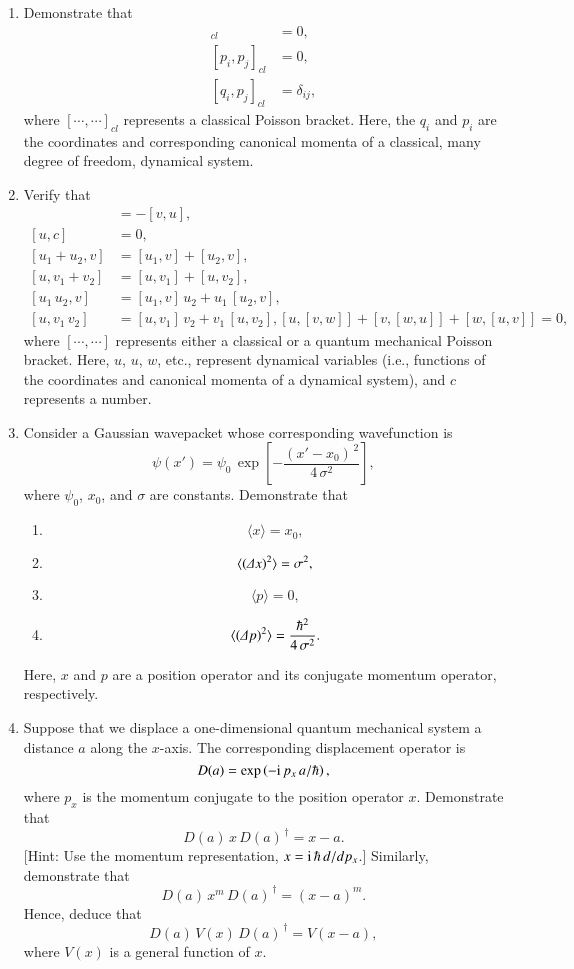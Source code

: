\begin{enumerate}[label=\thechapter.\arabic*,leftmargin=*,widest=9.20]
\item Demonstrate that
\begin{align}
[q_i, q_j]_{cl} &= 0,\nonumber\\[0.5ex]
[p_i, p_j]_{cl} &= 0,\nonumber\\[0.5ex]
[q_i, p_j]_{cl} &= \delta_{ij},\nonumber
\end{align}
where $[\cdots,\cdots]_{cl}$ represents a classical Poisson bracket. Here, the $q_i$ and $p_i$ are
the coordinates and corresponding canonical momenta of a classical, many degree of freedom, dynamical system.
\item Verify that 
\begin{align}
[u, v] &= - [v, u],\nonumber\\[0.5ex]
[u, c] &= 0,\nonumber\\[0.5ex]
[u_1+ u_2, v] &= [u_1, v] + [u_2, v],\nonumber\\[0.5ex]
[u, v_1 + v_2]&= [u, v_1] + [u, v_2],\nonumber\\[0.5ex]
[u_1\, u_2, v] &= [u_1, v] \,u_2 + u_1\, [u_2, v],\nonumber\\[0.5ex]
[u, v_1 \,v_2] &= [u, v_1] \,v_2 + v_1 \,[u, v_2],\nonumber
[u, [v, w] ]+ [v, [w, u] ] + [w, [u, v]] = 0,\nonumber
\end{align}
where $[\cdots,\cdots]$ represents either a classical or a quantum mechanical Poisson bracket. 
Here, $u$, $u$, $w$, etc., represent dynamical variables (i.e., functions of the coordinates and
canonical momenta of a dynamical system), and $c$ represents a number.

\item Consider a Gaussian wavepacket whose corresponding wavefunction is 
$$
\psi(x') =\psi_0\,\exp\left[-\frac{(x'-x_0)^{\,2}}{4\,\sigma^2}\right],
$$
where $\psi_0$, $x_0$, and $\sigma$ are constants. Demonstrate that
\begin{enumerate}
\item
$$\langle x\rangle = x_0,$$
\item
$$\langle ({\mit\Delta x})^2\rangle = \sigma^2,$$
\item
$$ \langle p\rangle = 0,$$
\item 
$$
\langle ({\mit\Delta} p)^2\rangle = \frac{\hbar^2}{4\,\sigma^2}.
$$
\end{enumerate}
 Here, $x$ and $p$ are a position operator and its conjugate momentum operator, respectively.
 
 \item Suppose that we displace a one-dimensional quantum mechanical system a distance $a$ along the $x$-axis. The
 corresponding displacement operator is\label{ex2.4}
 $$
 D(a) = \exp\left(-{\rm i}\,p_x\,a/\hbar\right),
 $$
 where $p_x$ is the momentum conjugate to the position operator $x$.  Demonstrate that
 $$
 D(a)\,x\,D(a)^{\,\dag} = x - a.
 $$
 [Hint: Use the momentum
 representation, $x = {\rm i}\,\hbar\,d/dp_x$.] Similarly, demonstrate that
 $$
 D(a)\,x^m\,D(a)^{\,\dag} = (x-a)^m.
 $$
 Hence, deduce that 
 $$
 D(a)\,V(x)\,D(a)^{\,\dag} = V(x-a),
 $$
 where $V(x)$ is a general function of $x$. 
 

\end{enumerate}
